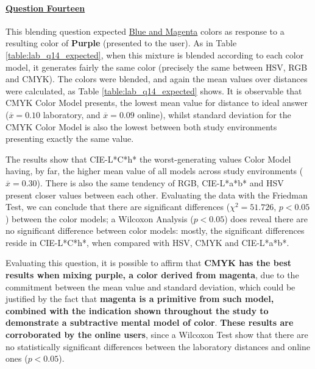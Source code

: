 \paragraph{\ul{Question Fourteen}}
%
This blending question expected \ul{Blue and Magenta} colors as response to a resulting color of \textbf{Purple} (presented to the user). As in Table \ref{table:lab_q14_expected},
when this mixture is blended according to each color model, it generates fairly the same color (precisely the same between HSV, RGB and CMYK).
The colors were blended, and again the mean values over distances were calculated, as Table \ref{table:lab_q14_expected} shows. It is observable that CMYK Color Model presents,
the lowest mean value for distance to ideal answer ($\overline{x} = 0.10$ laboratory, and $\overline{x} = 0.09$ online), whilst standard deviation for the CMYK Color Model is also the
lowest between both study environments presenting exactly the same value. \par
%
The results show that CIE-L*C*h* the worst-generating values Color Model having, by far, the higher mean value of all models across study environments ($\overline{x} = 0.30$). There is also the same tendency of RGB,
CIE-L*a*b* and HSV present closer values between each other. Evaluating the data with the Friedman Test, we can conclude that there are significant differences ($\chi^2 = 51.726$, $p < 0.05$)
between the color models; a Wilcoxon Analysis ($p < 0.05$) does reveal there are no significant difference between color models: mostly, the significant differences reside in CIE-L*C*h*, when
compared with HSV, CMYK and CIE-L*a*b*. \par
%
Evaluating this question, it is possible to affirm that \textbf{CMYK has the best results when mixing purple, a color derived from magenta}, due to the commitment between the mean value and standard deviation, which
could be justified by the fact that \textbf{magenta is a primitive from such model, combined with the indication shown throughout the study to demonstrate a subtractive mental model of color}.
\textbf{These results are corroborated by the online users}, since a Wilcoxon Test show that there are no statistically significant differences between the laboratory distances and online ones ($p < 0.05$).
%
